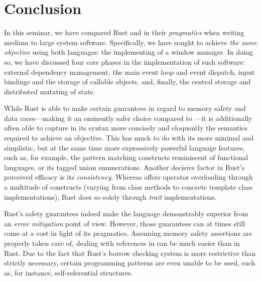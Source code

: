 \section{Conclusion}

In this seminar, we have compared Rust and \cpp in their \textit{pragmatics}
when writing medium to large system software. Specifically, we have sought to
achieve \textit{the same objective} using both languages: the implementing
of a window manager. In doing so, we have discussed four core phases in the
implementation of such software: external dependency management, the main event
loop and event dispatch, input bindings and the storage of callable objects,
and, finally, the central storage and distributed mutating of state.

While Rust is able to make certain guarantees in regard to memory safety and
data races---making it an eminently safer choice compared to \cpp---it is
additionally often able to capture in its syntax more concisely and eloquently
the semantics required to achieve an objective. This has much to do with its
more minimal and simplistic, but at the same time more expressively powerful
language features, such as, for example, the pattern matching constructs
reminiscent of functional languages, or its tagged union enumerations. Another
decisive factor in Rust's perceived efficacy is its \textit{consistency}.
Whereas \cpp offers operator overloading through a multitude of constructs
(varying from class methods to concrete template class implementations), Rust
does so solely through \textit{trait} implementations.

Rust's safety guarantees indeed make the language demonstrably superior from
an \textit{error mitigation} point of view. However, those guarantees can at
times still come at a cost in light of its pragmatics. Assuming memory safety
assertions are properly taken care of, dealing with references in \cpp can be
much easier than in Rust. Due to the fact that Rust's borrow checking system is
more restrictive than strictly necessary, certain programming patterns are even
unable to be used, such as, for instance, self-referential structures.

